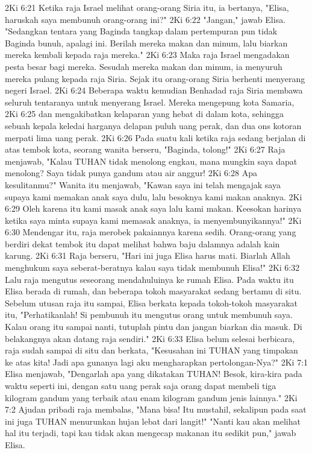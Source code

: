 2Ki 6:21  Ketika raja Israel melihat orang-orang Siria itu, ia bertanya, "Elisa, haruskah saya membunuh orang-orang ini?"
2Ki 6:22  "Jangan," jawab Elisa. "Sedangkan tentara yang Baginda tangkap dalam pertempuran pun tidak Baginda bunuh, apalagi ini. Berilah mereka makan dan minum, lalu biarkan mereka kembali kepada raja mereka."
2Ki 6:23  Maka raja Israel mengadakan pesta besar bagi mereka. Sesudah mereka makan dan minum, ia menyuruh mereka pulang kepada raja Siria. Sejak itu orang-orang Siria berhenti menyerang negeri Israel.
2Ki 6:24  Beberapa waktu kemudian Benhadad raja Siria membawa seluruh tentaranya untuk menyerang Israel. Mereka mengepung kota Samaria,
2Ki 6:25  dan mengakibatkan kelaparan yang hebat di dalam kota, sehingga sebuah kepala keledai harganya delapan puluh uang perak, dan dua ons kotoran merpati lima uang perak.
2Ki 6:26  Pada suatu kali ketika raja sedang berjalan di atas tembok kota, seorang wanita berseru, "Baginda, tolong!"
2Ki 6:27  Raja menjawab, "Kalau TUHAN tidak menolong engkau, mana mungkin saya dapat menolong? Saya tidak punya gandum atau air anggur!
2Ki 6:28  Apa kesulitanmu?" Wanita itu menjawab, "Kawan saya ini telah mengajak saya supaya kami memakan anak saya dulu, lalu besoknya kami makan anaknya.
2Ki 6:29  Oleh karena itu kami masak anak saya lalu kami makan. Keesokan harinya ketika saya minta supaya kami memasak anaknya, ia menyembunyikannya!"
2Ki 6:30  Mendengar itu, raja merobek pakaiannya karena sedih. Orang-orang yang berdiri dekat tembok itu dapat melihat bahwa baju dalamnya adalah kain karung.
2Ki 6:31  Raja berseru, "Hari ini juga Elisa harus mati. Biarlah Allah menghukum saya seberat-beratnya kalau saya tidak membunuh Elisa!"
2Ki 6:32  Lalu raja mengutus seseorang mendahuluinya ke rumah Elisa. Pada waktu itu Elisa berada di rumah, dan beberapa tokoh masyarakat sedang bertamu di situ. Sebelum utusan raja itu sampai, Elisa berkata kepada tokoh-tokoh masyarakat itu, "Perhatikanlah! Si pembunuh itu mengutus orang untuk membunuh saya. Kalau orang itu sampai nanti, tutuplah pintu dan jangan biarkan dia masuk. Di belakangnya akan datang raja sendiri."
2Ki 6:33  Elisa belum selesai berbicara, raja sudah sampai di situ dan berkata, "Kesusahan ini TUHAN yang timpakan ke atas kita! Jadi apa gunanya lagi aku mengharapkan pertolongan-Nya?"
2Ki 7:1  Elisa menjawab, "Dengarlah apa yang dikatakan TUHAN! Besok, kira-kira pada waktu seperti ini, dengan satu uang perak saja orang dapat membeli tiga kilogram gandum yang terbaik atau enam kilogram gandum jenis lainnya."
2Ki 7:2  Ajudan pribadi raja membalas, "Mana bisa! Itu mustahil, sekalipun pada saat ini juga TUHAN menurunkan hujan lebat dari langit!" "Nanti kau akan melihat hal itu terjadi, tapi kau tidak akan mengecap makanan itu sedikit pun," jawab Elisa.
